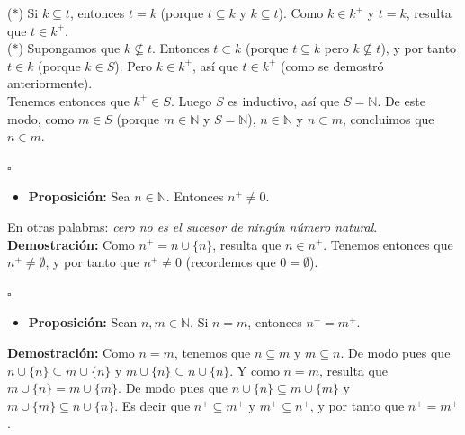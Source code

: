 \documentclass[10 pt]{article}
\begin{document}
{{($\ast$) Si $k \subseteq t$, entonces $t=k$ (porque $t \subseteq k$ y $k \subseteq t$). Como $k \in k^+$ y $t=k$, resulta que $t \in k^+$. \\

($\ast$) Supongamos que $k \nsubseteq t$. Entonces $t \subset k$ (porque $t \subseteq k$ pero $k \nsubseteq t$), y por tanto $t \in k$ (porque $k \in S$). Pero $k \in k^+$, así que $t \in k^+$ (como se demostró anteriormente). \\

Tenemos entonces que $k^+ \in S$. Luego $S$ es inductivo, así que $S=\mathbb N$. De este modo, como $m \in S$ (porque $m \in \mathbb N$ y $S=\mathbb N$), $n \in \mathbb N$ y $n \subset m$, concluimos que $n \in m$.} \\

\begin{flushright}
    $\square$
\end{flushright}

\begin{itemize}
    \item \Large{\textbf{Proposición:} Sea $n \in \mathbb N$. Entonces $n^+ \neq 0$.} \\
\end{itemize}

\Large{En otras palabras: \textit{cero no es el sucesor de ningún número natural}.} \\

\Large{\textbf{Demostración:} Como $n^+=n \cup \{n\}$, resulta que $n \in n^+$. Tenemos entonces que $n^+ \neq \emptyset$, y por tanto que $n^+ \neq 0$ (recordemos que $0=\emptyset$).} \\

\begin{flushright}
    $\square$
\end{flushright}

\begin{itemize}
    \item \Large{\textbf{Proposición:} Sean $n,m \in \mathbb N$. Si $n=m$, entonces $n^+=m^+$.} \\
\end{itemize}

\Large{\textbf{Demostración:} Como $n=m$, tenemos que $n \subseteq m$ y $m \subseteq n$. De modo pues que $n \cup \{n\} \subseteq m \cup \{n\}$ y $m \cup \{n\} \subseteq n \cup \{n\}$. Y como $n=m$, resulta que $m \cup \{n\}=m \cup \{m\}$. De modo pues que $n \cup \{n\} \subseteq m \cup \{m\}$ y $m \cup \{m\} \subseteq n \cup \{n\}$. Es decir que $n^+ \subseteq m^+$ y $m^+ \subseteq n^+$, y por tanto que $n^+=m^+$.}

}
\end{document}

